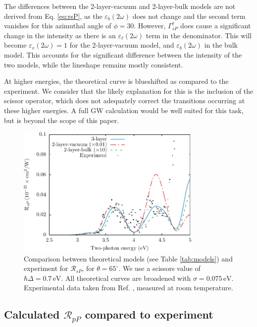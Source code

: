 \documentclass[11pt]{book}
\begin{document}
The differences between the 2-layer-vacuum and 2-layer-bulk models are not
derived from Eq. \eqref{eq:rsP}, as the $\varepsilon_{b}(2\omega)$ does not
change and the second term vanishes for this azimuthal angle of $\phi = 30$.
However, $\Gamma^{\ell}_{sP}$ does cause a significant change in the intensity
as there is an $\varepsilon_{\ell}(2\omega)$ term in the denominator. This will
become $\varepsilon_{v}(2\omega) = 1$ for the 2-layer-vacuum model, and
$\varepsilon_{b}(2\omega)$ in the bulk model. This accounts for the significant
difference between the intensity of the two models, while the lineshape remains
mostly consistent.

At higher energies, the theoretical curve is blueshifted as compared to the
experiment. We consider that the likely explanation for this is the inclusion of
the scissor operator, which does not adequately correct the transitions
occurring at these higher energies. A full GW calculation would be well suited
for this task, but is beyond the scope of this paper.

\begin{figure}
\centering
\includegraphics[width=0.8\textwidth]{../figures/04-results/fig-4_4_04}
\caption{Comparison between theoretical models (see Table
\ref{tab:models}) and experiment for $\mathcal{R}_{sP}$, for
$\theta=65^{\circ}$. We use a scissors value of $\hbar\Delta = 0.7\,\text{eV}$.
All theoretical curves are broadened with $\sigma=0.075\,\text{eV}$.
Experimental data taken from Ref. \cite{mejiaPRB02}, measured at room
temperature. \label{fig:RsP}}
\end{figure}


\subsection{Calculated \texorpdfstring{$\mathcal{R}_{pP}$}{RpP} compared to
experiment}\label{sec:RpP}
\end{document}
